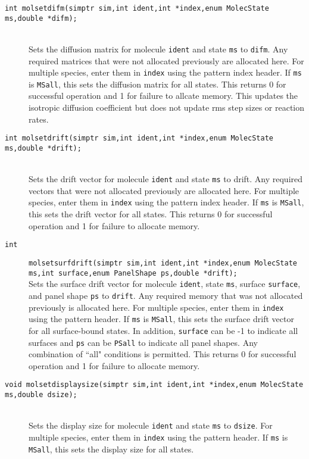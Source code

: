 \documentclass {book}
\begin{document}
\begin{description}
\item[\texttt{int molsetdifm(simptr sim,int ident,int *index,enum MolecState ms,double *difm);}]
\hfill \\
Sets the diffusion matrix for molecule \texttt{ident} and state \texttt{ms} to \texttt{difm}. Any required matrices that were not allocated previously are allocated here. For multiple species, enter them in \texttt{index} using the pattern index header. If \texttt{ms} is \texttt{MSall}, this sets the diffusion matrix for all states. This returns 0 for successful operation and 1 for failure to allcate memory. This updates the isotropic diffusion coefficient but does not update rms step sizes or reaction rates.

\item[\texttt{int molsetdrift(simptr sim,int ident,int *index,enum MolecState ms,double *drift);}]
\hfill \\
Sets the drift vector for molecule \texttt{ident} and state \texttt{ms} to drift. Any required vectors that were not allocated previously are allocated here. For multiple species, enter them in \texttt{index} using the pattern index header. If \texttt{ms} is \texttt{MSall}, this sets the drift vector for all states. This returns 0 for successful operation and 1 for failure to allocate memory.

\item[\texttt{int}]
\texttt{molsetsurfdrift(simptr sim,int ident,int *index,enum MolecState ms,int surface,enum PanelShape ps,double *drift);}
\hfill \\
Sets the surface drift vector for molecule \texttt{ident}, state \texttt{ms}, surface \texttt{surface}, and panel shape \texttt{ps} to \texttt{drift}. Any required memory that was not allocated previously is allocated here. For multiple species, enter them in \texttt{index} using the pattern header. If \texttt{ms} is \texttt{MSall}, this sets the surface drift vector for all surface-bound states. In addition, \texttt{surface} can be -1 to indicate all surfaces and \texttt{ps} can be \texttt{PSall} to indicate all panel shapes. Any combination of ``all" conditions is permitted. This returns 0 for successful operation and 1 for failure to allocate memory.

\item[\texttt{void molsetdisplaysize(simptr sim,int ident,int *index,enum MolecState ms,double dsize);}]
\hfill \\
Sets the display size for molecule \texttt{ident} and state \texttt{ms} to \texttt{dsize}. For multiple species, enter them in \texttt{index} using the pattern header. If \texttt{ms} is \texttt{MSall}, this sets the display size for all states.


\end{description}
\end{document}
